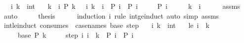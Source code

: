 \begin{isabellebody}
\ \ \ i\ k\ {\isacharcolon}{\kern0pt}{\isacharcolon}{\kern0pt}\ int\isanewline
\ \ \ {\isachardoublequoteopen}k\ {\isacharless}{\kern0pt}\ i{\isachardoublequoteclose}\ {\isachardoublequoteopen}P\ {\isacharparenleft}{\kern0pt}k\ {\isacharplus}{\kern0pt}\ {}{\isacharparenright}{\kern0pt}{\isachardoublequoteclose}\ {\isachardoublequoteopen}{\isasymAnd}i{\isachardot}{\kern0pt}\ k\ {\isacharless}{\kern0pt}\ i\ {\isasymLongrightarrow}\ P\ i\ {\isasymLongrightarrow}\ P\ {\isacharparenleft}{\kern0pt}i\ {\isacharplus}{\kern0pt}\ {}{\isacharparenright}{\kern0pt}{\isachardoublequoteclose}\isanewline
\ \ \ {\isachardoublequoteopen}P\ i{\isachardoublequoteclose}\isanewline
%
\isadelimproof
%
\endisadelimproof
%
\isatagproof
{}\isamarkupfalse%
\ {\isacharminus}{\kern0pt}\isanewline
\ \ \isamarkupfalse%
\ {\isachardoublequoteopen}k{\isacharplus}{\kern0pt}{}\ {\isasymle}\ i{\isachardoublequoteclose}\isanewline
\ \ \ \ \isamarkupfalse%
\ assms\ \isamarkupfalse%
\ auto\isanewline
\ \ \isamarkupfalse%
\ \isamarkupfalse%
\ {\isacharquery}{\kern0pt}thesis\isanewline
\ \ \ \ \isamarkupfalse%
\ {\isacharparenleft}{\kern0pt}induction\ i\ rule{\isacharcolon}{\kern0pt}\ int{\isacharunderscore}{\kern0pt}ge{\isacharunderscore}{\kern0pt}induct{\isacharparenright}{\kern0pt}\ {\isacharparenleft}{\kern0pt}auto\ simp{\isacharcolon}{\kern0pt}\ assms{\isacharparenright}{\kern0pt}\isanewline
{}\isamarkupfalse%
%
\endisatagproof
{\isafoldproof}%
%
\isadelimproof
\isanewline
%
\endisadelimproof
\isanewline
{}\isamarkupfalse%
\ int{\isacharunderscore}{\kern0pt}le{\isacharunderscore}{\kern0pt}induct\ {\isacharbrackleft}{\kern0pt}consumes\ {}{\isacharcomma}{\kern0pt}\ case{\isacharunderscore}{\kern0pt}names\ base\ step{\isacharbrackright}{\kern0pt}{\isacharcolon}{\kern0pt}\isanewline
\ \ \ i\ k\ {\isacharcolon}{\kern0pt}{\isacharcolon}{\kern0pt}\ int\isanewline
\ \ \ le{\isacharcolon}{\kern0pt}\ {\isachardoublequoteopen}i\ {\isasymle}\ k{\isachardoublequoteclose}\isanewline
\ \ \ \ \ base{\isacharcolon}{\kern0pt}\ {\isachardoublequoteopen}P\ k{\isachardoublequoteclose}\isanewline
\ \ \ \ \ step{\isacharcolon}{\kern0pt}\ {\isachardoublequoteopen}{\isasymAnd}i{\isachardot}{\kern0pt}\ i\ {\isasymle}\ k\ {\isasymLongrightarrow}\ P\ i\ {\isasymLongrightarrow}\ P\ {\isacharparenleft}{\kern0pt}i\ {\isacharminus}{\kern0pt}\ {}{\isacharparenright}{\kern0pt}{\isachardoublequoteclose}\isanewline

\end{isabellebody}
